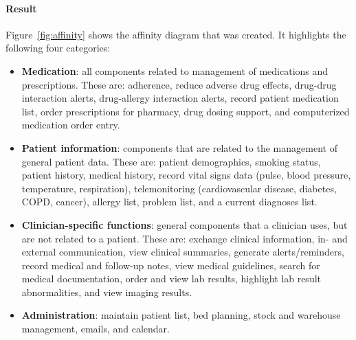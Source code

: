         \paragraph{Result} Figure~\ref{fig:affinity} shows the affinity diagram that was created. It highlights the following four categories:
        \begin{itemize}
            \item \textbf{Medication}: all components related to management of medications and prescriptions. These are: adherence, reduce adverse drug effects, drug-drug interaction alerts, drug-allergy interaction alerts, record patient medication list, order prescriptions for pharmacy, drug dosing support, and computerized medication order entry.
            \item \textbf{Patient information}: components that are related to the management of general patient data. These are: patient demographics, smoking status, patient history, medical history, record vital signs data (pulse, blood pressure, temperature, respiration), telemonitoring (cardiovascular disease, diabetes, COPD, cancer), allergy list, problem list, and a current diagnoses list.
            \item \textbf{Clinician-specific functions}: general components that a clinician uses, but are not related to a patient. These are: exchange clinical information, in- and external communication, view clinical summaries, generate alerts/reminders, record medical and follow-up notes, view medical guidelines, search for medical documentation, order and view lab results, highlight lab result abnormalities, and view imaging results.
            \item \textbf{Administration}: maintain patient list, bed planning, stock and warehouse management, emails, and calendar.
        \end{itemize}

